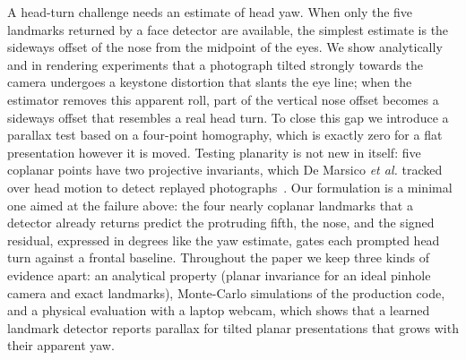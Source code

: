 \documentclass[journal]{IEEEtran}
\begin{document}
A head-turn challenge needs an estimate of head yaw. When only the five landmarks returned by a face detector are available, the simplest estimate is the sideways offset of the nose from the midpoint of the eyes. We show analytically and in rendering experiments that a photograph tilted strongly towards the camera undergoes a keystone distortion that slants the eye line; when the estimator removes this apparent roll, part of the vertical nose offset becomes a sideways offset that resembles a real head turn. To close this gap we introduce a parallax test based on a four-point homography, which is exactly zero for a flat presentation however it is moved. Testing planarity is not new in itself: five coplanar points have two projective invariants, which De Marsico \emph{et al.} tracked over head motion to detect replayed photographs~\cite{demarsico2012projective}. Our formulation is a minimal one aimed at the failure above: the four nearly coplanar landmarks that a detector already returns predict the protruding fifth, the nose, and the signed residual, expressed in degrees like the yaw estimate, gates each prompted head turn against a frontal baseline. Throughout the paper we keep three kinds of evidence apart: an analytical property (planar invariance for an ideal pinhole camera and exact landmarks), Monte-Carlo simulations of the production code, and a physical evaluation with a laptop webcam, which shows that a learned landmark detector reports parallax for tilted planar presentations that grows with their apparent yaw.
\end{document}
